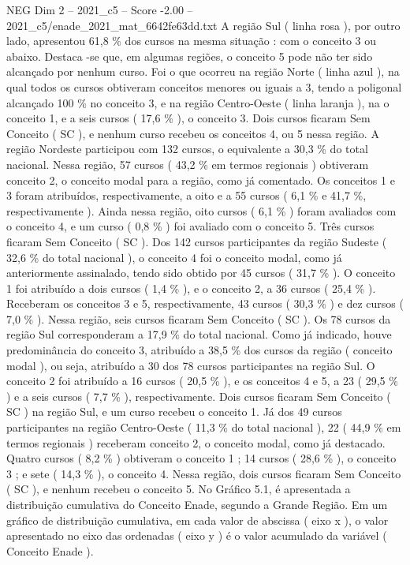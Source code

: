 \begin{textsample}{NEG Dim 2 – 2021\_c5 – Score -2.00 – 2021\_c5/enade\_2021\_mat\_6642fe63dd.txt}
A região Sul ( linha rosa ), por outro lado, apresentou 61,8 \% dos cursos na mesma situação : com o conceito 3 ou abaixo.
Destaca -se que, em algumas regiões, o conceito 5 pode não ter sido alcançado por nenhum curso.
Foi o que ocorreu na região Norte ( linha azul ), na qual todos os cursos obtiveram conceitos menores ou iguais a 3, tendo a poligonal alcançado 100 \% no conceito 3, e na região Centro-Oeste ( linha laranja ), na o conceito 1, e a seis cursos ( 17,6 \% ), o conceito 3.
Dois cursos ficaram Sem Conceito ( SC ), e nenhum curso recebeu os conceitos 4, ou 5 nessa região.
A região Nordeste participou com 132 cursos, o equivalente a 30,3 \% do total nacional.
Nessa região, 57 cursos ( 43,2 \% em termos regionais ) obtiveram conceito 2, o conceito modal para a região, como já comentado.
Os conceitos 1 e 3 foram atribuídos, respectivamente, a oito e a 55 cursos ( 6,1 \% e 41,7 \%, respectivamente ).
Ainda nessa região, oito cursos ( 6,1 \% ) foram avaliados com o conceito 4, e um curso ( 0,8 \% ) foi avaliado com o conceito 5.
Três cursos ficaram Sem Conceito ( SC ).
Dos 142 cursos participantes da região Sudeste ( 32,6 \% do total nacional ), o conceito 4 foi o conceito modal, como já anteriormente assinalado, tendo sido obtido por 45 cursos ( 31,7 \% ).
O conceito 1 foi atribuído a dois cursos ( 1,4 \% ), e o conceito 2, a 36 cursos ( 25,4 \% ).
Receberam os conceitos 3 e 5, respectivamente, 43 cursos ( 30,3 \% ) e dez cursos ( 7,0 \% ).
Nessa região, seis cursos ficaram Sem Conceito ( SC ).
Os 78 cursos da região Sul corresponderam a 17,9 \% do total nacional.
Como já indicado, houve predominância do conceito 3, atribuído a 38,5 \% dos cursos da região ( conceito modal ), ou seja, atribuído a 30 dos 78 cursos participantes na região Sul.
O conceito 2 foi atribuído a 16 cursos ( 20,5 \% ), e os conceitos 4 e 5, a 23 ( 29,5 \% ) e a seis cursos ( 7,7 \% ), respectivamente.
Dois cursos ficaram Sem Conceito ( SC ) na região Sul, e um curso recebeu o conceito 1.
Já dos 49 cursos participantes na região Centro-Oeste ( 11,3 \% do total nacional ), 22 ( 44,9 \% em termos regionais ) receberam conceito 2, o conceito modal, como já destacado.
Quatro cursos ( 8,2 \% ) obtiveram o conceito 1 ; 14 cursos ( 28,6 \% ), o conceito 3 ; e sete ( 14,3 \% ), o conceito 4.
Nessa região, dois cursos ficaram Sem Conceito ( SC ), e nenhum recebeu o conceito 5.
No Gráfico 5.1, é apresentada a distribuição cumulativa do Conceito Enade, segundo a Grande Região.
Em um gráfico de distribuição cumulativa, em cada valor de abscissa ( eixo x ), o valor apresentado no eixo das ordenadas ( eixo y ) é o valor acumulado da variável ( Conceito Enade ).

\end{textsample}
